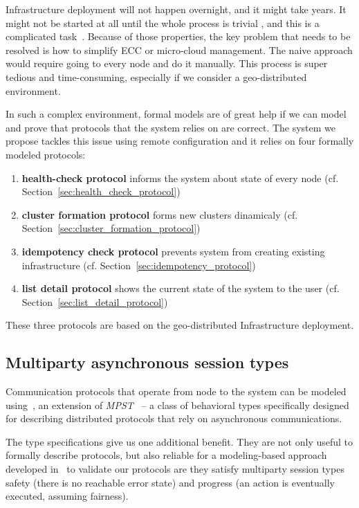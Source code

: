 Infrastructure deployment will not happen overnight, and it might take years. It might not be started at all until the whole process is trivial \cite{SatyanarayananBCD09}, and this is a complicated task~\cite{JararwehDAAAB16}. Because of those properties, the key problem that needs to be resolved is how to simplify ECC or micro-cloud management. The naive approach would require going to every node and do it manually. This process is super tedious and time-consuming, especially if we consider a geo-distributed environment. 

In such a complex environment, formal models are of great help if we can model and prove that protocols that the system relies on are correct. The system we propose tackles this issue using remote configuration and it relies on four formally modeled protocols:

\begin{enumerate}[start=1,label={(\bfseries \arabic*)}]
	\item \textbf{health-check protocol} informs the system about state of every node (cf. Section~\ref{sec:health_check_protocol})
	\item \textbf{cluster formation protocol} forms new clusters dinamicaly (cf. Section~\ref{sec:cluster_formation_protocol})
	\item \textbf{idempotency check protocol} prevents system from creating existing infrastructure (cf. Section~\ref{sec:idempotency_protocol})
	\item \textbf{list detail protocol} shows the current state of the system to the user (cf. Section~\ref{sec:list_detail_protocol})
\end{enumerate}

\noindent
These three protocols are based on the geo-distributed Infrastructure deployment.
%
%
\subsection{Multiparty asynchronous session types}\label{sec:multiparty}
%
Communication protocols that operate from node to the system can be modeled using~\cite{HuY17}, an extension of \emph{MPST}~\cite{HondaYC08} -- a class of behavioral types specifically designed for describing distributed protocols that rely on asynchronous communications. 

The type specifications give us one additional benefit. They are not only useful to formally describe protocols, but also reliable for a modeling-based approach developed in~\cite{HuY17} to validate our protocols are they satisfy multiparty session types safety (there is no reachable error state) and progress (an action is eventually executed, assuming fairness).

